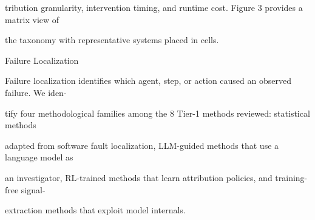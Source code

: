 \begin{flushleft}
\noindent tribution granularity, intervention timing, and runtime cost. Figure 3 provides a matrix view of\par
\noindent the taxonomy with representative systems placed in cells.\par
\par\smallskip
{} Failure Localization\par
\noindent Failure localization identifies which agent, step, or action caused an observed failure. We iden-\par
\noindent tify four methodological families among the 8 Tier-1 methods reviewed: statistical methods\par
\noindent adapted from software fault localization, LLM-guided methods that use a language model as\par
\noindent an investigator, RL-trained methods that learn attribution policies, and training-free signal-\par
\noindent extraction methods that exploit model internals.\par
\end{flushleft}
